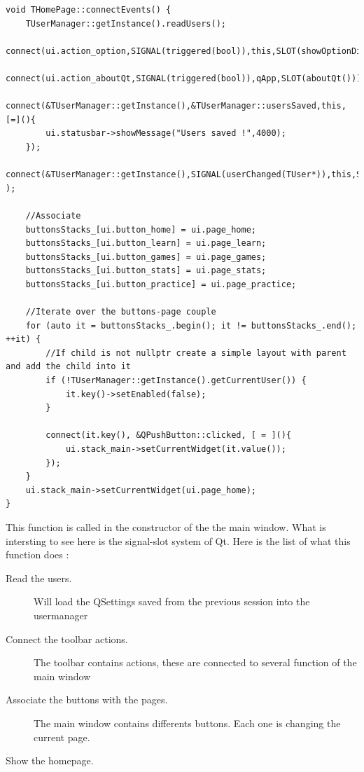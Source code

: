 \begin{lstlisting}
void THomePage::connectEvents() {
    TUserManager::getInstance().readUsers();
    connect(ui.action_option,SIGNAL(triggered(bool)),this,SLOT(showOptionDialog()));
    connect(ui.action_aboutQt,SIGNAL(triggered(bool)),qApp,SLOT(aboutQt()));
    connect(&TUserManager::getInstance(),&TUserManager::usersSaved,this,[=](){
        ui.statusbar->showMessage("Users saved !",4000);
    });
    connect(&TUserManager::getInstance(),SIGNAL(userChanged(TUser*)),this,SLOT(updateUI(TUser*)) );

	//Associate 
    buttonsStacks_[ui.button_home] = ui.page_home;
    buttonsStacks_[ui.button_learn] = ui.page_learn;
    buttonsStacks_[ui.button_games] = ui.page_games;
    buttonsStacks_[ui.button_stats] = ui.page_stats;
    buttonsStacks_[ui.button_practice] = ui.page_practice;

    //Iterate over the buttons-page couple
    for (auto it = buttonsStacks_.begin(); it != buttonsStacks_.end(); ++it) {
        //If child is not nullptr create a simple layout with parent and add the child into it
        if (!TUserManager::getInstance().getCurrentUser()) {
            it.key()->setEnabled(false);
        }

        connect(it.key(), &QPushButton::clicked, [ = ](){
            ui.stack_main->setCurrentWidget(it.value());
        });
    }
    ui.stack_main->setCurrentWidget(ui.page_home);
}
\end{lstlisting}
This function is called in the constructor of the the main window. What is intersting to see here is the signal-slot system of Qt.
Here is the list of what this function does :
\begin{description}
	\item[Read the users.] Will load the QSettings saved from the previous session into the usermanager
	\item[Connect the toolbar actions.] The toolbar contains actions, these are connected to several function of the main window
	\item[Associate the buttons with the pages.] The main window contains differents buttons. Each one is changing the current page.
	\item[Show the homepage.]
\end{description}

